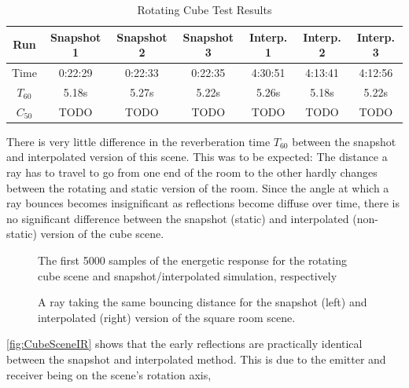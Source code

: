 \begin{table}[t!]
    \centering
    \begin{tabular}{| c | c | c | c | c | c | c |}
        \hline
        Run        & Snapshot 1 & Snapshot 2 & Snapshot 3 & Interp. 1 & Interp. 2 & Interp. 3 \\
        \hline
        Time       & 0:22:29    & 0:22:33    & 0:22:35    & 4:30:51   & 4:13:41   & 4:12:56   \\
        \hline
        \(T_{60}\) & 5.18s      & 5.27s      & 5.22s      & 5.26s     & 5.18s     & 5.22s     \\
        \hline
        \(C_{50}\) & TODO       & TODO       & TODO       & TODO      & TODO      & TODO      \\
        \hline
    \end{tabular}
    \caption{Rotating Cube Test Results}\label{tbl:CubeSceneTable}
\end{table}
There is very little difference in the reverberation time \(T_{60}\) between the snapshot and interpolated version of this scene.
This was to be expected:
The distance a ray has to travel to go from one end of the room to the other hardly changes between the rotating and static version of the room.
Since the angle at which a ray bounces becomes insignificant as reflections become diffuse over time,
there is no significant difference between the snapshot (static) and interpolated (non-static) version of the cube scene.
\newline
\begin{figure}[t!]
    \begin{center}
        
    \end{center}
    \caption{The first 5000 samples of the energetic response for the rotating cube scene and snapshot/interpolated simulation, respectively}\label{fig:CubeSceneIR}
\end{figure}
\begin{figure}[t!]
    \begin{center}
        
    \end{center}
    \caption{A ray taking the same bouncing distance for the snapshot (left) and interpolated (right) version of the square room scene.}\label{fig:CubeRotation}
\end{figure}
\autoref{fig:CubeSceneIR} shows that the early reflections are practically identical between the snapshot and interpolated method.
This is due to the emitter and receiver being on the scene's rotation axis,
